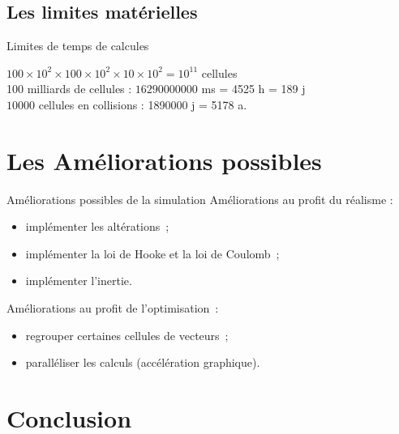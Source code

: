 \documentclass{beamer}
\begin{document}
\subsection{Les limites matérielles}
\begin{frame}{Limites de temps de calcules}
  \begin{center}
  \end{center}
  \begin{center}
  \end{center}
  $100 \times 10^2 \times 100 \times 10^2 \times 10 \times 10^2 = 10^{11}$ cellules \\
  100 milliards de cellules : $16290000000$ ms = 4525 h = 189 j\\
  $10000$ cellules en collisions : 1890000 j = 5178 a.
\end{frame}

\section{Les Améliorations possibles}
\begin{frame}{Améliorations possibles de la simulation}
  Améliorations au profit du réalisme :
  \begin{itemize}
    \item implémenter les altérations~;
    \item implémenter la loi de Hooke et la loi de Coulomb~;
    \item implémenter l'inertie.
  \end{itemize}
  Améliorations au profit de l'optimisation~:
  \begin{itemize}
    \item regrouper certaines cellules de vecteurs~;
    \item paralléliser les calculs (accélération graphique).
  \end{itemize}
\end{frame}

\section{Conclusion}
\end{document}
